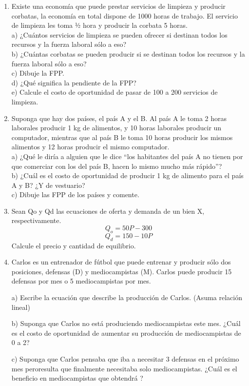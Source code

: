 \documentclass{article}
\begin{document}
\begin{enumerate}
    \item Existe una economía que puede prestar servicios de limpieza y producir corbatas, la economía
en total dispone de 1000 horas de trabajo. El servicio de limpieza les toma ½ hora y producir la
corbata 5 horas.\\
a) ¿Cuántos servicios de limpieza se pueden ofrecer si destinan todos los recursos y la fuerza
laboral sólo a eso?\\
b) ¿Cuántas corbatas se pueden producir si se destinan todos los recursos y la fuerza laboral sólo a
eso?\\
c) Dibuje la FPP.\\
d) ¿Qué significa la pendiente de la FPP?\\
e) Calcule el costo de oportunidad de pasar de 100 a 200 servicios de limpieza.\\
    \item Suponga que hay dos países, el país A y el B. Al país A le toma 2 horas laborales producir 1 kg de
alimentos, y 10 horas laborales producir un computador, mientras que al país B le toma 10 horas
producir los mismos alimentos y 12 horas producir el mismo computador.\\
a) ¿Qué le diría a alguien que le dice “los habitantes del país A no tienen por que comerciar con los
del país B, hacen lo mismo mucho más rápido”?\\
b) ¿Cuál es el costo de oportunidad de producir 1 kg de alimento para el país A y B? ¿Y de
vestuario?\\
c) Dibuje las FPP de los países y comente.

    \item Sean Qo y Qd las ecuaciones de oferta y demanda de un bien X, respectivamente.
    $$Q_o = 50P-300$$
    $$Q_d=150-10P$$
    Calcule el precio y cantidad de equilibrio.
    
    \item Carlos es un entrenador de fútbol que puede entrenar y producir sólo dos posiciones, defensas (D) y mediocampistas (M). Carlos puede producir 15 defensas por mes o 5 mediocampistas por mes.

a) Escribe la ecuación que describe la producción de Carlos. (Asuma relación lineal)

b) Suponga que Carlos no está produciendo mediocampistas este mes. ¿Cuál es el costo de oportunidad de aumentar su producción de mediocampistas de 0 a 2?

c) Suponga que Carlos pensaba que iba a necesitar 3 defensas en el próximo mes peroresulta que finalmente necesitaba solo mediocampistas. ¿Cuál es el beneficio en mediocampistas que obtendrá ?


\end{enumerate}
\end{document}
